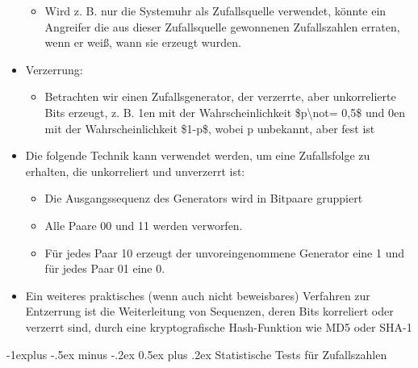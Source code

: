 \documentclass[a4paper]{article}
\makeatletter
\renewcommand{\subsection}{\@startsection{subsection}{2}{0mm}%
 {-1explus -.5ex minus -.2ex}%
 {0.5ex plus .2ex}%
 {\normalfont\normalsize\bfseries}}
\makeatother
\begin{document}
\begin{multicols}{3}
\begin{itemize}
              \begin{itemize}
                  \item
                        Wird z. B. nur die Systemuhr als Zufallsquelle verwendet, könnte ein
                        Angreifer die aus dieser Zufallsquelle gewonnenen Zufallszahlen
                        erraten, wenn er weiß, wann sie erzeugt wurden.
              \end{itemize}
        \item
              Verzerrung:

              \begin{itemize}
                  \item
                        Betrachten wir einen Zufallsgenerator, der verzerrte, aber
                        unkorrelierte Bits erzeugt, z. B. 1en mit der Wahrscheinlichkeit
                        \$p\textbackslash not= 0,5\$ und 0en mit der Wahrscheinlichkeit
                        \$1-p\$, wobei p unbekannt, aber fest ist
              \end{itemize}
        \item
              Die folgende Technik kann verwendet werden, um eine Zufallsfolge zu
              erhalten, die unkorreliert und unverzerrt ist:

              \begin{itemize}
                  \item
                        Die Ausgangssequenz des Generators wird in Bitpaare gruppiert
                  \item
                        Alle Paare 00 und 11 werden verworfen.
                  \item
                        Für jedes Paar 10 erzeugt der unvoreingenommene Generator eine 1 und
                        für jedes Paar 01 eine 0.
              \end{itemize}
        \item
              Ein weiteres praktisches (wenn auch nicht beweisbares) Verfahren zur
              Entzerrung ist die Weiterleitung von Sequenzen, deren Bits korreliert
              oder verzerrt sind, durch eine kryptografische Hash-Funktion wie MD5
              oder SHA-1
    \end{itemize}


    \subsection{Statistische Tests für
        Zufallszahlen}


\end{multicols}
\end{document}
